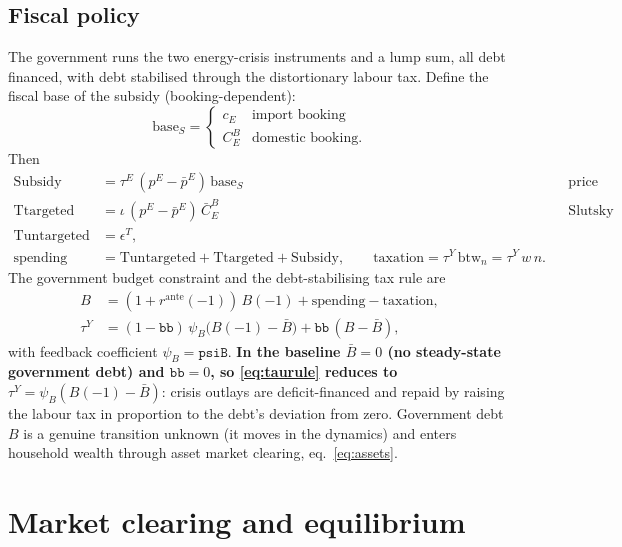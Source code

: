 \documentclass[11pt]{article}
\newcommand{\pE}{p^{E}}
\begin{document}
\subsection{Fiscal policy}\label{sec:fiscal}

The government runs the two energy-crisis instruments and a lump sum, all
debt financed, with debt stabilised through the distortionary labour tax.
Define the fiscal base of the subsidy (booking-dependent):
\begin{equation}
\text{base}_S=\begin{cases} c_E & \text{import booking}\\ C^{B}_{E} & \text{domestic booking.}\end{cases}
\end{equation}
Then
\begin{align}
\text{Subsidy} &= \tau^{E}\,(\pE-\bar\pE)\,\text{base}_S
&& \text{price cap (cost scales with actual use),}\\
\text{Ttargeted} &= \iota\,(\pE-\bar\pE)\,\bar C^{B}_{E}
&& \text{Slutsky transfer (cost scales with pre-crisis brown use),}\\
\text{Tuntargeted} &= \epsilon^{T}, &&\\[2pt]
\text{spending} &= \text{Tuntargeted}+\text{Ttargeted}+\text{Subsidy},\qquad
\text{taxation}=\tau^{Y}\,\text{btw}_n=\tau^{Y}\,w\,n. &&
\end{align}
The government budget constraint and the debt-stabilising tax rule are
\begin{align}
B &= (1+r^{\text{ante}}(-1))\,B(-1)+\text{spending}-\text{taxation},
\label{eq:gbc}\\
\tau^{Y} &= (1-\texttt{bb})\,\psi_B\bigl(B(-1)-\bar B\bigr)+\texttt{bb}\,(B-\bar B),
\label{eq:taurule}
\end{align}
with feedback coefficient $\psi_B=\texttt{psiB}$. \textbf{In the baseline
$\bar B=0$ (no steady-state government debt) and $\texttt{bb}=0$, so
\eqref{eq:taurule} reduces to $\tau^{Y}=\psi_B(B(-1)-\bar B)$}: crisis outlays
are deficit-financed and repaid by raising the labour tax in proportion to the
debt's deviation from zero. Government debt $B$ is a genuine transition unknown
(it moves in the dynamics) and enters household wealth through asset market
clearing, eq.~\eqref{eq:assets}.

\section{Market clearing and equilibrium}\label{sec:clearing}
\end{document}
